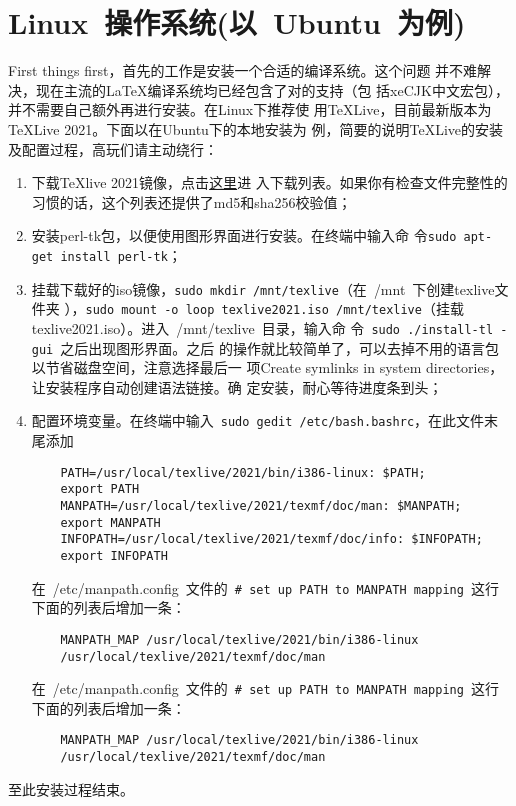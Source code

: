 \section{Linux~操作系统(以~Ubuntu~为例)}
First things first，首先的工作是安装一个合适的\XeTeX{}编译系统。这个问题
并不难解决，现在主流的\LaTeX{}编译系统均已经包含了对\XeTeX{}的支持（包
括xeCJK中文宏包），并不需要自己额外再进行安装。在Linux下推荐使
用\TeX{}Live，目前最新版本为\TeX{}Live 2021。下面以在Ubuntu下的本地安装为
例，简要的说明\TeX{}Live的安装及配置过程，高玩们请主动绕行：

\begin{enumerate}
\item 下载\TeX{}live 2021镜像，点击\href{http://ftp.ctex.org/mirrors/CTAN/systems/texlive/Images/}{这里}进
  入下载列表。如果你有检查文件完整性的习惯的话，这个列表还提供了md5和sha256校验值；
\item 安装perl-tk包，以便使用图形界面进行安装。在终端中输入命
  令\texttt{\footnotesize sudo apt-get install perl-tk}；
\item 挂载下载好的iso镜像，\texttt{\footnotesize sudo mkdir
    /mnt/texlive}（在~{/mnt}~下创建texlive文件夹
  ），\texttt{\footnotesize sudo mount -o loop texlive2021.iso
    /mnt/texlive}（挂载texlive2021.iso）。进入~/mnt/texlive~目录，输入命
  令~\texttt{\footnotesize sudo ./install-tl -gui}~之后出现图形界面。之后
  的操作就比较简单了，可以去掉不用的语言包以节省磁盘空间，注意选择最后一
  项Create symlinks in system directories，让安装程序自动创建语法链接。确
  定安装，耐心等待进度条到头；
\item 配置环境变量。在终端中输入~\texttt{\footnotesize sudo gedit
    /etc/bash.bashrc}，在此文件末尾添加

  \begin{lstlisting}
    PATH=/usr/local/texlive/2021/bin/i386-linux: $PATH;
    export PATH
    MANPATH=/usr/local/texlive/2021/texmf/doc/man: $MANPATH;
    export MANPATH
    INFOPATH=/usr/local/texlive/2021/texmf/doc/info: $INFOPATH;
    export INFOPATH
  \end{lstlisting}

  在~{/etc/manpath.config}~文件的~\texttt{\footnotesize\# set up PATH to
    MANPATH mapping}~这行下面的列表后增加一条：
  \begin{lstlisting}
    MANPATH_MAP /usr/local/texlive/2021/bin/i386-linux
    /usr/local/texlive/2021/texmf/doc/man
  \end{lstlisting}

  在~{/etc/manpath.config}~文件的~\texttt{\footnotesize\# set up PATH to
    MANPATH mapping}~这行下面的列表后增加一条：
  \begin{lstlisting}
    MANPATH_MAP /usr/local/texlive/2021/bin/i386-linux
    /usr/local/texlive/2021/texmf/doc/man
  \end{lstlisting}
\end{enumerate}
至此安装过程结束。

